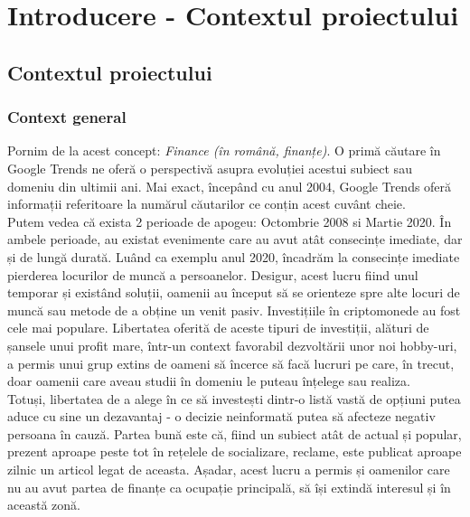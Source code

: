 \chapter{Introducere - Contextul proiectului}\label{ch:context}
\pagestyle{fancy}

\section{Contextul proiectului}\label{sec:context}

\subsection{Context general}\label{subsec:numesub}

Pornim de la acest concept: {\it Finance (în română, finanțe)}. O primă căutare în Google Trends ne oferă o perspectivă
asupra evoluției acestui subiect sau domeniu din ultimii ani. Mai exact, începând cu anul 2004, Google Trends oferă informații referitoare la numărul căutarilor 
ce conțin acest cuvânt cheie.\\

Putem vedea că exista 2 perioade de apogeu: Octombrie 2008 si Martie 2020. În ambele perioade, au existat evenimente care au avut atât consecințe imediate, dar și de lungă durată.
Luând ca exemplu anul 2020, încadrăm la consecințe imediate pierderea locurilor de muncă a persoanelor. Desigur, acest lucru fiind unul temporar și existând soluții, 
oamenii au început să se orienteze spre alte locuri de muncă sau metode de a obține un venit pasiv.
Investițiile în criptomonede au fost cele mai populare. Libertatea oferită de aceste tipuri de investiții, alături de șansele unui profit mare,
într-un context favorabil dezvoltării unor noi hobby-uri, a permis unui grup extins de oameni să încerce să facă lucruri pe care, 
în trecut, doar oamenii care aveau studii în domeniu le puteau înțelege sau realiza.\\

Totuși, libertatea de a alege în ce să investești dintr-o listă vastă de opțiuni putea aduce cu sine un dezavantaj - o decizie neinformată
putea să afecteze negativ persoana în cauză. Partea bună este că, fiind un subiect atât de actual și popular, prezent aproape peste tot în rețelele de socializare, 
reclame, este publicat aproape zilnic un articol legat de aceasta.
Așadar, acest lucru a permis și oamenilor care nu au avut partea de finanțe ca ocupație principală, să își extindă interesul și în această zonă.\\

